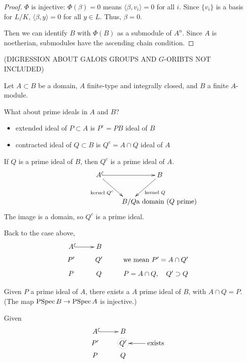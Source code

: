 \documentclass [letterpaper,11pt,twoside]{article}
\begin{document}
\begin{proof}
    $\Phi$ is injective: $\Phi(\beta) = 0$ means $\langle \beta, v_i\rangle = 0$ for all $i$.  Since $\{v_i\}$ is a basis for $L / K$, $\langle \beta, y \rangle = 0$ for all $y \in L$.  Thus, $\beta = 0$.

    Then we can identify $B$ with $\Phi(B)$ as a submodule of $A^n$.  Since $A$ is noetherian, submodules have the ascending chain condition.
  \end{proof}

  (DIGRESSION ABOUT GALOIS GROUPS AND $G$-ORIBTS NOT INCLUDED)

  Let $A \subset B$ be a domain, $A$ finite-type and integrally closed, and $B$ a finite $A$-module.

  What about prime ideals in $A$ and $B$?
  \begin{itemize}
    \item[] extended ideal of $P\subset A$ is $P^e = PB$ ideal of $B$
    \item[] contracted ideal of $Q\subset B$ is $Q^c = A \cap Q$ ideal of $A$
  \end{itemize}

  \begin{fact*}
    If $Q$ is a prime ideal of $B$, then $Q^c$ is a prime ideal of $A$.
    $$
    \xymatrix{
      A \ar@{^{(}->}[rr] \ar[dr]_{\text{kernel $Q^c$}} && B \ar[dl]^{\text{kernel $Q$}} \\
      & B / Q \text{\makebox[0pt][l]{a domain ($Q$ prime)}}
    }
    $$
    The image is a domain, so $Q^c$ is a prime ideal.
  \end{fact*}

  Back to the case above,
  $$
  \xymatrix @R=0.5em{
    A \ar@{^{(}->}[r] & B \\
    P' & Q' & \text{we mean }P' = A \cap Q' \\
    P & Q & P = A \cap Q,\quad Q'\supset Q
  }
  $$

  \begin{fact}
    Given $P$ a prime ideal of $A$, there exists a $A$ prime ideal of $B$, with $A \cap Q = P$.  (The map $\operatorname{PSpec} B \to \operatorname{PSpec} A$ is injective.)
  \end{fact}

  \begin{fact}[Going Up]
    Given
    $$
    \xymatrix @R=0.25em{
      A \ar@{^{(}->}[r] & B \\
      P' &  *+[o][F.]{Q'} & \ar[l] \text{exists} \\
      P & Q
    }
    $$
  \end{fact}
\end{document}
